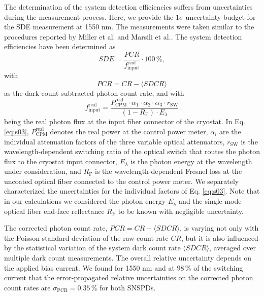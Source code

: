 \documentclass[aip,apl,showpacs,showkeys,preprint,superscriptaddress,preprintnumbers,amsmath,amssymb]{revtex4-1}
\begin{document}
\begin{bibunit}
The determination of the system detection efficiencies suffers from uncertainties during the measurement process. Here, we provide the $1\sigma$ uncertainty budget for the SDE measurement at 1550 nm. The measurements were taken similar to the procedures reported by Miller et al. \cite{Miller2011} and Marsili et al.\cite{Marsili2013}. The system detection efficiencies have been determined as
\begin{equation}
\label{eq:s01}
SDE=\frac{PCR}{f^\mathrm{real}_\mathrm{input}}\cdot 100\,\%,
\end{equation}
with
\begin{equation}
\label{eq:s02}
PCR=CR-\langle SDCR\rangle
\end{equation}
as the dark-count-subtracted photon count rate, and with
\begin{equation}
\label{eq:s03}
f^\mathrm{real}_\mathrm{input}=\frac{P^\mathrm{real}_\mathrm{CPM}\cdot\alpha_1\cdot\alpha_2\cdot\alpha_3\cdot r_\mathrm{SW}}{\left(1-R_\mathrm{F}\right)\cdot E_\lambda}
\end{equation}
being the real photon flux at the input fiber connector of the cryostat. In Eq. \ref{eq:s03}, $P^\mathrm{real}_\mathrm{CPM}$ denotes the real power at the control power meter, $\alpha_i$ are the individual attenuation factors of the three variable optical attenuators, $r_\mathrm{SW}$ is the wavelength-dependent switching ratio of the optical switch that routes the photon flux to the cryostat input connector, $E_\lambda$ is the photon energy at the wavelength under consideration, and $R_\mathrm{F}$ is the wavelength-dependent Fresnel loss at the uncoated optical fiber connected to the control power meter. We separately characterized the uncertainties for the individual factors of Eq. \ref{eq:s03}. Note that in our calculations we considered the photon energy $E_\mathrm{\lambda}$ and the single-mode optical fiber end-face reflectance $R_\mathrm{F}$ to be known with negligible uncertainty.

The corrected photon count rate, $PCR=CR-\langle SDCR\rangle$, is varying not only with the Poisson standard deviation of the raw count rate $CR$, but it is also influenced by the statistical variation of the system dark count rate $\langle SDCR\rangle$, averaged over multiple dark count measurements. The overall relative uncertainty depends on the applied bias current. We found for 1550 nm and at $98\,\%$ of the switching current that the error-propagated relative uncertainties on the corrected photon count rates are $\sigma_\mathrm{PCR}=0.35\,\%$ for both SNSPDs.


\end{bibunit}
\end{document}
